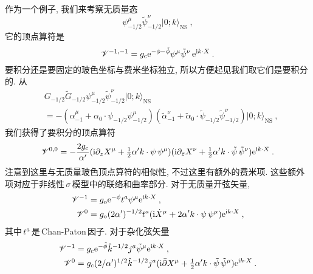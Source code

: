 作为一个例子, 我们来考察无质量态
\begin{equation}
    \psi_{-1/2}^{\mu}\tilde{\psi}_{-1/2}^{\nu} \lvert 0;k\rangle_{\text{NS}} \:, \label{12.3.41}
\end{equation}
它的顶点算符是
\begin{equation}
    \mathscr{V}^{-1,-1} = g_{\mathrm{c}}\mathrm{e}^{-\phi-\tilde{\phi}}\psi^{\mu}\tilde{\psi}^{\nu}\,\mathrm{e}^{\mathrm{i} k\cdot X}\:. \label{12.3.42}
\end{equation}
要积分还是要固定的玻色坐标与费米坐标独立, 所以方便起见我们取它们是要积分的. 从
\begin{align}
    & G_{-1/2}\tilde{G}_{-1/2}\psi_{-1/2}^{\mu}\tilde{\psi}_{-1/2}^{\nu}\lvert 0;k\rangle_{\text{NS}} \nonumber\\
    &=-(\alpha_{-1}^{\mu}+\alpha_{0}\cdot \psi_{-1/2}\psi_{-1/2}^{\mu})
    (\tilde{\alpha}^{\nu}_{-1}+\tilde{\alpha}_{0}\cdot \tilde{\psi}_{-1/2}\tilde{\psi}_{-1/2}^{\nu})\lvert 0;k\rangle_{\text{NS}} \:, \label{12.3.43}
\end{align}
我们获得了要积分的顶点算符
\begin{equation}
    \mathscr{V}^{0,0} = -\frac{2g_{\mathrm{c}}}{\alpha^{\prime}}(\mathrm{i}\partial_{z}X^{\mu}+
    \tfrac{1}{2}\alpha^{\prime}k\cdot \psi\,\psi^{\mu})(\mathrm{i}\partial_{\bar{z}}X^{\nu}
    +\tfrac{1}{2}\alpha^{\prime}k\cdot\tilde{\psi}\,\tilde{\psi}^{\nu}) \mathrm{e}^{\mathrm{i} k\cdot X} \:. \label{12.3.44}
\end{equation}
注意到这里与无质量玻色顶点算符的相似性, 不过这里有额外的费米项. 这些额外项对应于非线性\,$\sigma\,$模型中的联络和曲率部分. 对于无质量开弦矢量,
\begin{subequations}
\begin{align}
    \mathscr{V}^{-1} &= g_{\mathrm{o}}\mathrm{e}^{-\phi}t^{a}\psi^{\mu}\mathrm{e}^{\mathrm{i} k\cdot X} \:, \label{12.3.45a} \\
    \mathscr{V}^{0} &= g_{\mathrm{o}}(2\alpha^{\prime})^{-1/2}t^{a}(\mathrm{i} \dot{X}^{\mu}
    +2\alpha^{\prime}k\cdot\psi\,\psi^{\mu})\mathrm{e}^{\mathrm{i} k\cdot X} \:, \label{12.3.45b}
\end{align} \label{12.3.45}
\end{subequations}
其中$\,t^{a}\,$是\,Chan-Paton\,因子. 对于杂化弦矢量
\begin{subequations}
\begin{align}
    \mathscr{V}^{-1} &= g_{\mathrm{c}}\mathrm{e}^{-\tilde{\phi}}\hat{k}^{-1/2}j^{a}\tilde{\psi}^{\mu}\mathrm{e}^{\mathrm{i} k\cdot X} \:, \label{12.3.46a}\\
    \mathscr{V}^{0} &= g_{\mathrm{c}}(2/\alpha^{\prime})^{1/2}\hat{k}^{-1/2}j^{a}
    (\mathrm{i}\bar{\partial}X^{\mu}+\tfrac{1}{2}\alpha^{\prime}k\cdot \tilde{\psi}\,\tilde{\psi}^{\mu})\mathrm{e}^{\mathrm{i} k\cdot X}\:.
    \label{12.3.46b}
\end{align} \label{12.3.46}
\end{subequations}
